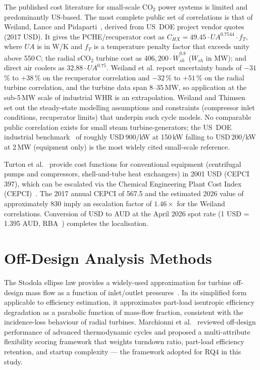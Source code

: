 \documentclass[12pt,a4paper]{report}
\begin{document}
The published cost literature for small-scale CO$_2$ power systems is limited
and predominantly US-based. The most complete public set of correlations is
that of Weiland, Lance and Pidaparti~\cite{Weiland2019}, derived from
US~DOE project vendor quotes (2017 USD). It gives the PCHE/recuperator cost as
$C_{HX} = 49.45 \cdot UA^{0.7544} \cdot f_T$, where $UA$ is in W/K and $f_T$
is a temperature penalty factor that exceeds unity above 550\,\textdegree C;
the radial sCO$_2$ turbine cost as $406{,}200 \cdot \dot{W}_{sh}^{0.8}$
($\dot{W}_{sh}$ in MW); and direct air coolers as $32.88 \cdot UA^{0.75}$.
Weiland et al. report uncertainty bands of $-31$\,\% to $+38$\,\% on the
recuperator correlation and $-32$\,\% to $+51$\,\% on the radial turbine
correlation, and the turbine data span 8--35\,MW, so application at the
sub-5\,MW scale of industrial WHR is an extrapolation. Weiland and
Thimsen~\cite{Weiland2016} set out the steady-state modelling assumptions and
constraints (compressor inlet conditions, recuperator limits) that underpin
such cycle models. No comparable public correlation exists for small steam
turbine-generators; the US~DOE industrial benchmark~\cite{DOE2012} of roughly
USD\,900/kW at 150\,kW falling to USD\,200/kW at 2\,MW (equipment only) is
the most widely cited small-scale reference.

Turton et al.~\cite{Turton2012} provide cost functions for conventional
equipment (centrifugal pumps and compressors, shell-and-tube heat exchangers)
in 2001 USD (CEPCI 397), which can be escalated via the Chemical Engineering
Plant Cost Index (CEPCI)~\cite{CEPCI2026}. The 2017 annual CEPCI of 567.5 and
the estimated 2026 value of approximately 830 imply an escalation factor of
$1.46\times$ for the Weiland correlations. Conversion of USD to AUD at the
April 2026 spot rate (1 USD = 1.395 AUD, RBA~\cite{RBA2026}) completes the
localisation.

\section{Off-Design Analysis Methods}
\label{sec:lit_offdesign}

The Stodola ellipse law provides a widely-used approximation for turbine
off-design mass flow as a function of inlet/outlet pressures~\cite{Marchionni2020}.
In its simplified form applicable to efficiency estimation, it approximates
part-load isentropic efficiency degradation as a parabolic function of
mass-flow fraction, consistent with the incidence-loss behaviour of radial
turbines. Marchionni et al.~\cite{Marchionni2020} reviewed off-design
performance of advanced thermodynamic cycles and proposed a multi-attribute
flexibility scoring framework that weights turndown ratio, part-load efficiency
retention, and startup complexity --- the framework adopted for RQ4 in this
study.
\end{document}
